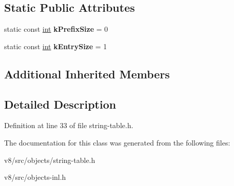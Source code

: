 \subsection*{Static Public Attributes}
\begin{DoxyCompactItemize}
\item 
\mbox{\label{classv8_1_1internal_1_1StringTableShape_aa1859dc6e32c7ac264b48b78bd8bfacc}} 
static const \mbox{\hyperlink{classint}{int}} {\bfseries k\+Prefix\+Size} = 0
\item 
\mbox{\label{classv8_1_1internal_1_1StringTableShape_a37d6c45788b0b15cc43f490c005f1c74}} 
static const \mbox{\hyperlink{classint}{int}} {\bfseries k\+Entry\+Size} = 1
\end{DoxyCompactItemize}
\subsection*{Additional Inherited Members}


\subsection{Detailed Description}


Definition at line 33 of file string-\/table.\+h.



The documentation for this class was generated from the following files\+:\begin{DoxyCompactItemize}
\item 
v8/src/objects/string-\/table.\+h\item 
v8/src/objects-\/inl.\+h\end{DoxyCompactItemize}
